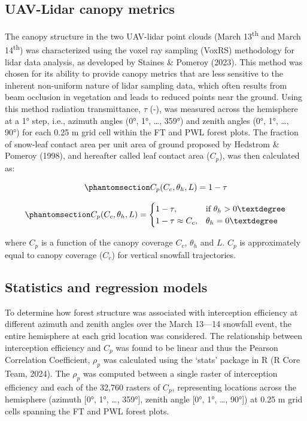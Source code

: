 \documentclass[
  letterpaper,
  DIV=11,
  numbers=noendperiod]{scrartcl}
\begin{document}
\subsection{UAV-Lidar canopy metrics}\label{uav-lidar-canopy-metrics}

The canopy structure in the two UAV-lidar point clouds (March
13\textsuperscript{th} and March 14\textsuperscript{th}) was
characterized using the voxel ray sampling (VoxRS) methodology for lidar
data analysis, as developed by Staines \& Pomeroy (2023). This method
was chosen for its ability to provide canopy metrics that are less
sensitive to the inherent non-uniform nature of lidar sampling data,
which often results from beam occlusion in vegetation and leads to
reduced points near the ground. Using this method radiation
transmittance, \(\tau\) (-), was measured across the hemisphere at a 1°
step, i.e., azimuth angles (0°, 1°, \ldots, 359°) and zenith angles (0°,
1°, \ldots, 90°) for each 0.25 m grid cell within the FT and PWL forest
plots. The fraction of snow-leaf contact area per unit area of ground
proposed by Hedstrom \& Pomeroy (1998), and hereafter called leaf
contact area (\(C_p\)), was then calculated as:

\begin{equation}\phantomsection\label{eq-lca}{
C_p(C_c, \theta_h, L) = 1-\tau
}\end{equation}

\begin{equation}\phantomsection\label{eq-tf-ode}{
C_p(C_c, \theta_h, L) = \begin{cases}
    1-\tau,& \text{if } \theta_h> 0°\\
    1-\tau \approx C_c ,              & \theta_h= 0°
\end{cases}
}\end{equation}

where \(C_p\) is a function of the canopy coverage \(C_c\), \(\theta_h\)
and \(L\). \(C_p\) is approximately equal to canopy coverage (\(C_c\))
for vertical snowfall trajectories.

\subsection{Statistics and regression
models}\label{statistics-and-regression-models}

To determine how forest structure was associated with interception
efficiency at different azimuth and zenith angles over the March 13---14
snowfall event, the entire hemisphere at each grid location was
considered. The relationship between interception efficiency and \(C_p\)
was found to be linear and thus the Pearson Correlation Coefficient,
\(\rho_p\) was calculated using the `stats' package in R (R Core Team,
2024). The \(\rho_p\) was computed between a single raster of
interception efficiency and each of the 32,760 rasters of \(C_p\),
representing locations across the hemisphere (azimuth {[}0°, 1°, \ldots,
359°{]}, zenith angle {[}0°, 1°, \ldots, 90°{]}) at 0.25 m grid cells
spanning the FT and PWL forest plots.
\end{document}
